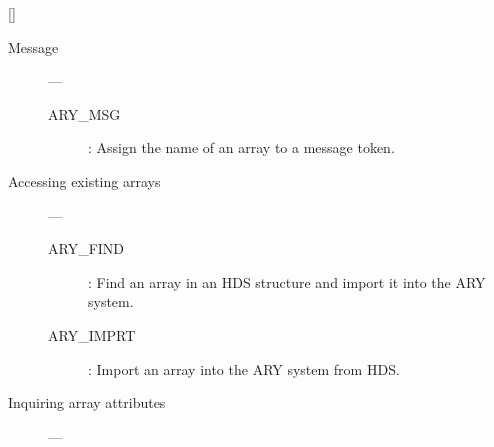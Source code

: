 \vspace{-9mm}

\hfill []

\vspace{2mm}

\begin{description}

\item [Message] ---

\begin{description}
\item [ARY\_MSG] : Assign the name of an array to a message token.
\end{description}

\item [Accessing existing arrays] ---

\begin{description}
\item [ARY\_FIND] : Find an array in an HDS structure and import it into the ARY system.
\item [ARY\_IMPRT] : Import an array into the ARY system from HDS.
\end{description}

\item [Inquiring array attributes] ---


\end{description}
